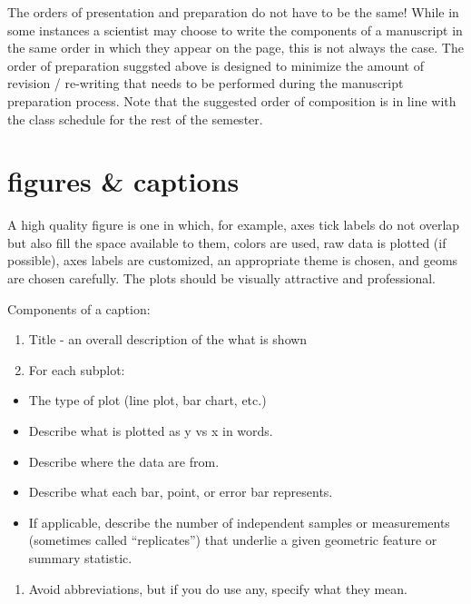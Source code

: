 \documentclass[
]{krantz}
\providecommand{\tightlist}{%
  \setlength{\itemsep}{0pt}\setlength{\parskip}{0pt}}
\begin{document}
The orders of presentation and preparation do not have to be the same! While in some instances a scientist may choose to write the components of a manuscript in the same order in which they appear on the page, this is not always the case. The order of preparation suggsted above is designed to minimize the amount of revision / re-writing that needs to be performed during the manuscript preparation process. Note that the suggested order of composition is in line with the class schedule for the rest of the semester.

\hypertarget{figures-captions}{%
\section{figures \& captions}\label{figures-captions}}

A high quality figure is one in which, for example, axes tick labels do not overlap but also fill the space available to them, colors are used, raw data is plotted (if possible), axes labels are customized, an appropriate theme is chosen, and geoms are chosen carefully. The plots should be visually attractive and professional.

Components of a caption:

\begin{enumerate}
\def\labelenumi{\arabic{enumi}.}
\tightlist
\item
  Title - an overall description of the what is shown
\item
  For each subplot:
\end{enumerate}

\begin{itemize}
\tightlist
\item
  The type of plot (line plot, bar chart, etc.)
\item
  Describe what is plotted as y vs x in words.
\item
  Describe where the data are from.
\item
  Describe what each bar, point, or error bar represents.
\item
  If applicable, describe the number of independent samples or measurements (sometimes called ``replicates'') that underlie a given geometric feature or summary statistic.
\end{itemize}

\begin{enumerate}
\def\labelenumi{\arabic{enumi}.}
\setcounter{enumi}{2}
\tightlist
\item
  Avoid abbreviations, but if you do use any, specify what they mean.
\end{enumerate}
\end{document}
